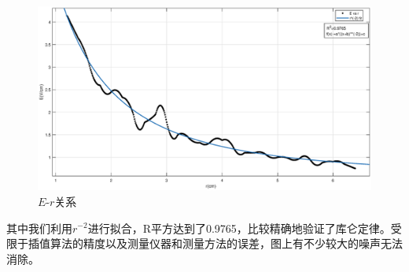 \documentclass{WHUReport}
\begin{document}
\begin{multicols}{2}
	\begin{figure}[H]
		\centering
		\includegraphics[width=\linewidth]{figs/E-r.eps}
		\caption{$E\mbox{-}r$关系}
	\end{figure}
	其中我们利用$r^{-2}$进行拟合，R平方达到了0.9765，比较精确地验证了库仑定律。受限于插值算法的精度以及测量仪器和测量方法的误差，图上有不少较大的噪声无法消除。

\end{multicols}
\end{document}
